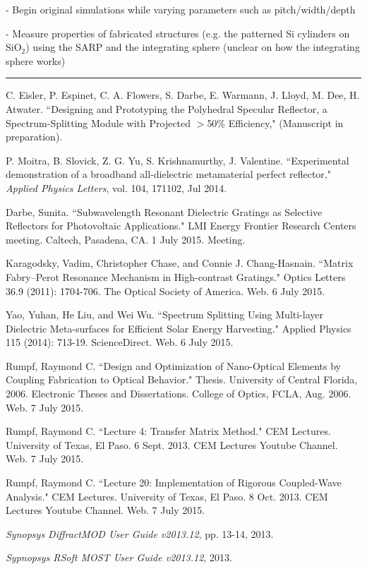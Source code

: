 \documentclass{article}
\begin{document}
- Begin original simulations while varying parameters such as pitch/width/depth

- Measure properties of fabricated structures (e.g. the patterned Si cylinders on SiO$_2$) using the SARP and the integrating sphere (unclear on how the integrating sphere works)

\begin{center}
\rule{450pt}{1pt}
\end{center}
\pagebreak
\begin{thebibliography}{9}
C. Eisler, P. Espinet, C. A. Flowers, S. Darbe, E. Warmann, J. Lloyd, M. Dee, H. Atwater. ``Designing and Prototyping the Polyhedral Specular Reflector, a Spectrum-Splitting Module with Projected $>$50\% Efficiency," (Manuscript in preparation).

P. Moitra, B. Slovick, Z. G. Yu, S. Krishnamurthy, J. Valentine. ``Experimental demonstration of a broadband all-dielectric metamaterial perfect reflector," \emph{Applied Physics Letters}, vol. 104, 171102, Jul 2014.

Darbe, Sunita. ``Subwavelength Resonant Dielectric Gratings as Selective Reflectors for Photovoltaic Applications." LMI Energy Frontier Research Centers meeting. Caltech, Pasadena, CA. 1 July 2015. Meeting.

Karagodsky, Vadim, Christopher Chase, and Connie J. Chang-Hasnain. ``Matrix Fabry–Perot Resonance Mechanism in High-contrast Gratings." Optics Letters 36.9 (2011): 1704-706. The Optical Society of America. Web. 6 July 2015.

Yao, Yuhan, He Liu, and Wei Wu. ``Spectrum Splitting Using Multi-layer Dielectric Meta-surfaces for Efficient Solar Energy Harvesting." Applied Physics 115 (2014): 713-19. ScienceDirect. Web. 6 July 2015.

Rumpf, Raymond C.  ``Design and Optimization of Nano-Optical Elements by Coupling Fabrication to Optical Behavior." Thesis. University of Central Florida, 2006. Electronic Theses and Dissertations. College of Optics, FCLA, Aug. 2006. Web. 7 July 2015.

Rumpf, Raymond C. ``Lecture 4: Transfer Matrix Method." CEM Lectures. University of Texas, El Paso. 6 Sept. 2013. CEM Lectures Youtube Channel. Web. 7 July 2015.

Rumpf, Raymond C. ``Lecture 20: Implementation of Rigorous Coupled-Wave Analysis." CEM Lectures. University of Texas, El Paso. 8 Oct. 2013. CEM Lectures Youtube Channel. Web. 7 July 2015.

\emph{Synopsys DiffractMOD User Guide v2013.12}, pp. 13-14, 2013.

\emph{Sypnopsys RSoft MOST User Guide v2013.12}, 2013.

\end{thebibliography}
\end{document}

